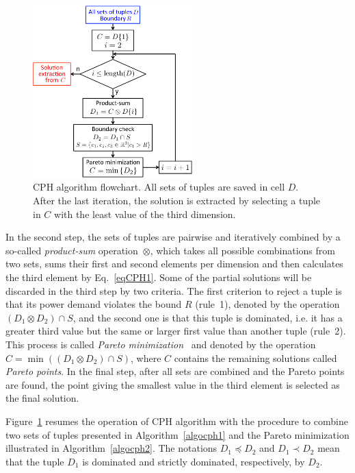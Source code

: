 \begin{figure}[ht]
\centering
\includegraphics[width=0.55\textwidth]{./chapters/chapter4/images/CPHschema.pdf} 
\caption{CPH algorithm flowchart. All sets of tuples are saved in cell $D$. After the last iteration, the solution is extracted by selecting a tuple in $C$ with the least value of the third dimension.} 
\label{fig:SS2b} 
\end{figure}
In the second step, the sets of tuples are pairwise and iteratively combined by a so-called \textit{product-sum} operation~$\otimes$, which takes all possible combinations from two sets, sums their first and second elements per dimension and then calculates the third element by Eq.~\eqref{eqCPH1}. Some of the partial solutions will be discarded in the third step by two criteria. The first criterion to reject a tuple is that its power demand violates the bound $R$ (rule~1), denoted by the operation $(D_1 \otimes D_2)\cap S$, and the second one is that this tuple is dominated, i.e. it has a greater third value but the same or larger first value than another tuple (rule~2). This process is called \textit{Pareto minimization}~\cite{Shojaei13} and denoted by the operation $C=\min{((D_1 \otimes D_2)\cap S)}$, where $C$ contains the remaining solutions called \textit{Pareto points}. In the final step, after all sets are combined and the Pareto points are found, the point giving the smallest value in the third element is selected as the final solution. 

Figure~\ref{fig:SS2b} resumes the operation of CPH algorithm with
the procedure to combine two sets of tuples presented in Algorithm~\ref{algocph1} and the Pareto minimization illustrated in Algorithm~\ref{algocph2}. The notations $D_1 \preceq D_2$ and $D_1 \prec D_2$ mean that the tuple $D_1$ is dominated and strictly dominated, respectively, by $D_2$.

